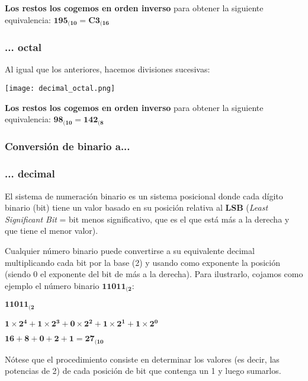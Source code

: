 \textbf{Los restos los cogemos en orden inverso} para obtener la siguiente equivalencia: $\mathbf{195_{(10} = C3_{(16}}$

\subsubsection*{... octal}
Al igual que los anteriores, hacemos divisiones sucesivas:

\begin{center}
    \vspace{-10pt}
    \texttt{[image: decimal\_octal.png]}
    \vspace{-15pt}
\end{center}

\textbf{Los restos los cogemos en orden inverso} para obtener la siguiente equivalencia: $\mathbf{98_{(10} = 142_{(8}}$


\subsubsection{Conversión de binario a...}

\subsubsection*{... decimal}
El sistema de numeración binario es un sistema posicional donde cada dígito binario (bit) tiene un valor basado en su posición relativa al \textbf{LSB} (\textit{Least Significant Bit} = bit menos significativo, que es el que está más a la derecha y que tiene el menor valor).

Cualquier número binario puede convertirse a su equivalente decimal multiplicando cada bit por la base (2) y usando como exponente la posición (siendo 0 el exponente del bit de más a la derecha). Para ilustrarlo, cojamos como ejemplo el número binario $\mathbf{11011_{(2}}$:

\begin{center}
    \vspace{-20pt}

    $ \mathbf{11011_{(2}} $

    $ \mathbf{1\times2^4 + 1\times2^3 + 0\times2^2 + 1\times2^1 + 1\times2^0} $

    $ \mathbf{16 + 8 + 0 + 2 + 1 = 27_{(10}} $
    \vspace{-15pt}
\end{center}

Nótese que el procedimiento consiste en determinar los valores (es decir, las potencias de 2) de cada posición de bit que contenga un 1 y luego sumarlos.

